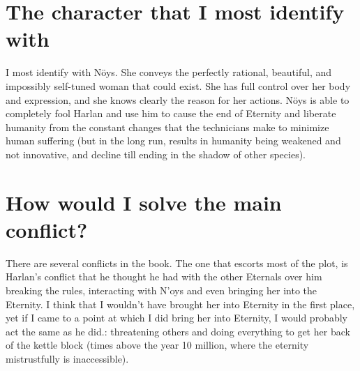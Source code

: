 \documentclass[]{article}
\begin{document}
        \begin{multicols}{2}
        \section{The character that I most identify with}
        {\sf I most identify with N\"oys. She conveys the perfectly rational, beautiful, and impossibly self-tuned woman that could exist. She has full control over her body and expression, and she knows clearly the reason for her actions. N\"oys is able to completely fool Harlan and use him to cause the end of Eternity and liberate humanity from the constant changes that the technicians make to minimize human suffering (but in the long run, results in humanity being weakened and not innovative, and decline till ending in the shadow of other species). }
        \vfill\null 
        
        \columnbreak 
        \section{How would I solve the main conflict?}
        {\sf There are several conflicts in the book. The one that escorts most of the plot, is Harlan's conflict that he thought he had with the other Eternals over him breaking the rules, interacting with N'oys and even bringing her into the Eternity. I think that I wouldn't have brought her into Eternity in the first place, yet if I came to a point at which I did bring her into Eternity, I would probably act the same as he did.: threatening others and doing everything to get her back of the kettle block (times above the year 10 million, where the eternity mistrustfully is inaccessible). }
    \end{multicols}
    \dotfill
    
\end{document}
